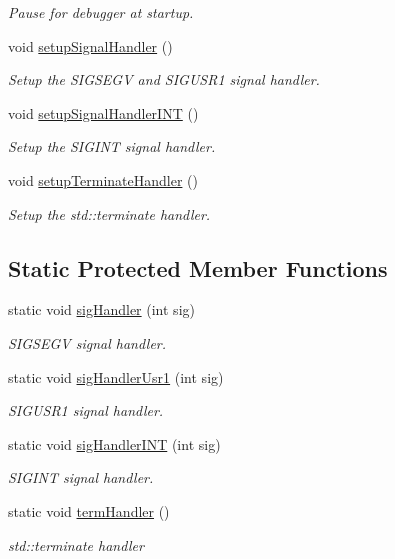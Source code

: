 \begin{DoxyCompactItemize}
\begin{DoxyCompactList}\small\item\em Pause for debugger at startup. \end{DoxyCompactList}\item 
void \hyperlink{structvt_1_1runtime_1_1_runtime_af87ef11218f0c1d095dcdcd4cfe4521e}{setup\+Signal\+Handler} ()
\begin{DoxyCompactList}\small\item\em Setup the S\+I\+G\+S\+E\+GV and S\+I\+G\+U\+S\+R1 signal handler. \end{DoxyCompactList}\item 
void \hyperlink{structvt_1_1runtime_1_1_runtime_a382e68597ae7acb16bdb9f1c3ab4f010}{setup\+Signal\+Handler\+I\+NT} ()
\begin{DoxyCompactList}\small\item\em Setup the S\+I\+G\+I\+NT signal handler. \end{DoxyCompactList}\item 
void \hyperlink{structvt_1_1runtime_1_1_runtime_ad66c903b37209c7499ebdf53efb5f9b3}{setup\+Terminate\+Handler} ()
\begin{DoxyCompactList}\small\item\em Setup the std\+::terminate handler. \end{DoxyCompactList}\end{DoxyCompactItemize}
\subsection*{Static Protected Member Functions}
\begin{DoxyCompactItemize}
\item 
static void \hyperlink{structvt_1_1runtime_1_1_runtime_a15fd3d8eb4952deca7488ff4fa07258c}{sig\+Handler} (int sig)
\begin{DoxyCompactList}\small\item\em S\+I\+G\+S\+E\+GV signal handler. \end{DoxyCompactList}\item 
static void \hyperlink{structvt_1_1runtime_1_1_runtime_a833f09083e671080fb8ae1a44bc50321}{sig\+Handler\+Usr1} (int sig)
\begin{DoxyCompactList}\small\item\em S\+I\+G\+U\+S\+R1 signal handler. \end{DoxyCompactList}\item 
static void \hyperlink{structvt_1_1runtime_1_1_runtime_a3ce54aa1371a6448670e06049a0985c4}{sig\+Handler\+I\+NT} (int sig)
\begin{DoxyCompactList}\small\item\em S\+I\+G\+I\+NT signal handler. \end{DoxyCompactList}\item 
static void \hyperlink{structvt_1_1runtime_1_1_runtime_abe295b9ea216fafe2b494e2bc609f8fb}{term\+Handler} ()
\begin{DoxyCompactList}\small\item\em std\+::terminate handler \end{DoxyCompactList}\end{DoxyCompactItemize}
